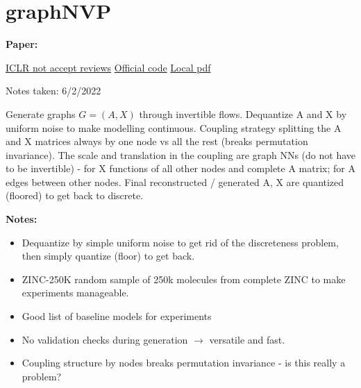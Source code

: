\clearpage

\section{graphNVP}\label{sec:graphNVP}

\begin{notebox}
\textbf{Paper: } 
\vspace{5pt}

\href{https://openreview.net/forum?id=ryxQ6T4YwB}{ICLR not accept reviews}
\hspace{1cm}
\href{https://github.com/pfnet-research/graph-nvp}{Official code}
\hspace{1cm}
\href{run:/home/magda/Dropbox/Zot/Madhawa et al_2019_GraphNVP.pdf}{Local pdf}

\hfill Notes taken: 6/2/2022 
\end{notebox}

\begin{notebox}[colback=red!5]
\tldr Generate graphs $G = (A, X)$ through invertible flows. Dequantize A and X by uniform noise to make modelling continuous. Coupling strategy splitting the A and X matrices always by one node vs all the rest (breaks permutation invariance). The scale and translation in the coupling are graph NNs (do not have to be invertible) - for X functions of all other nodes and complete A matrix; for A edges between other nodes. Final reconstructed / generated A, X are quantized (floored) to get back to discrete.
\end{notebox}

\begin{notebox}[colback=yellow!5]
\textbf{Notes:} 
\begin{itemize}[nosep]
\item Dequantize by simple uniform noise to get rid of the discreteness problem, then simply quantize (floor) to get back.
\item ZINC-250K random sample of 250k molecules from complete ZINC to make experiments manageable. 
\item Good list of baseline models for experiments
\item No validation checks during generation $\to$ versatile and fast.
\item Coupling structure by nodes breaks permutation invariance - is this really a problem?
\end{itemize}
\end{notebox}

